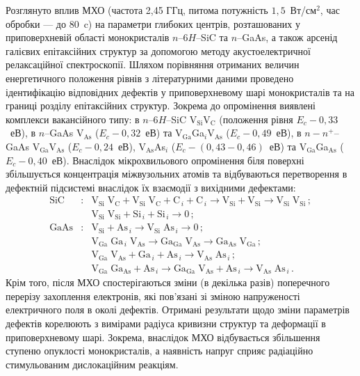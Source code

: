 Розглянуто вплив МХО (частота 2,45 ГГц, питома потужність  $1,5$~Вт/см$^2$, час обробки --- до 80~c) на параметри глибоких центрів, розташованих у приповерхневій області монокристалів $n$--6$H$--SiC та $n$--GaAs, а також арсенід галієвих епітаксійних структур за допомогою методу акустоелектричної релаксаційної спектроскопії.
Шляхом порівняння отриманих величин енергетичного положення рівнів з літературними даними проведено ідентифікацію відповідних дефектів у приповерхневому шарі монокристалів та на границі розділу епітаксійних структур.
Зокрема до опромінення виявлені комплекси вакансійного типу:
в $n$--6$H$--SiC V$_\text{Si}$V$_\text{C}$ (положення рівня $E_c-0,33$~еВ),
в $n$--GaAs V$_\text{As}$ ($E_c-0,32$~еВ) та V$_\text{Ga}$Ga$_i$V$_\text{As}$ ($E_c-0,49$~еВ),
в $n-n^+$--GaAs V$_\text{Ga}$V$_\text{As}$ ($E_c-0,24$~еВ), V$_\text{As}$As$_i$ ($E_c-(0,43-0,46)$~еВ) та V$_\text{Ga}$Ga$_\text{As}$ ($E_c-0,40$~еВ).
Внаслідок мікрохвильового опромінення біля поверхні збільшується концентрація міжвузольних атомів та відбуваються перетворення в дефектній
підсистемі внаслідок їх взаємодії з вихідними дефектами:
\begin{eqnarray*}
  \text{SiC}&:&\text{V}_\text{Si}\;\text{V}_\text{C}+\text{V}_\text{Si}\;\text{V}_\text{C}+\text{C}_{\,i}+ \text{C}_{\,i} \rightarrow \text{V}_\text{Si}+ \text{V}_\text{Si}\rightarrow \text{V}_\text{Si}\;\text{V}_\text{Si}\,;\\
  &&\text{V}_\text{Si}\;\text{V}_\text{Si}+\text{Si}_{\,i}+ \text{Si}_{\,i} \rightarrow 0\,;\\
  \text{GaAs}&:&\text{V}_\text{Si}+ \text{As}_{\,i} \rightarrow\text{V}_\text{Si}\;\text{As}_{\,i} \rightarrow 0\,;\\
   &&  \text{V}_\text{Ga}\;\text{Ga}_{\,i}\;\text{V}_\text{As}\rightarrow \text{Ga}_\text{Ga}\;\text{V}_\text{As}
  \rightarrow \text{Ga}_\text{As}\;\text{V}_\text{Ga} \,;\\
  &&\text{V}_\text{Ga}\;\text{V}_\text{As}+\text{Ga}_{\,i}+\text{As}_{\,i} \rightarrow \text{V}_\text{As}\;\text{As}_{\,i}\,;\\
  &&  \text{V}_\text{Ga}\;\text{Ga}_\text{As}+\text{As}_{\,i} \rightarrow
  \text{Ga}_\text{Ga}\;\text{V}_\text{As}+\text{As}_{\,i} \rightarrow
  \text{V}_\text{As}\;\text{As}_{\,i}\,.
\end{eqnarray*}
Крім того, після МХО спостерігаються зміни (в декілька разів) поперечного перерізу захоплення електронів,
які пов'язані зі зміною напруженості електричного поля в околі дефектів.
Отримані результати щодо зміни параметрів дефектів корелюють з вимірами радіуса кривизни структур та деформації в приповерхневому шарі.
Зокрема, внаслідок МХО відбувається збільшення ступеню опуклості монокристалів, а наявність напруг сприяє радіаційно стимульованим дислокаційним реакціям.


